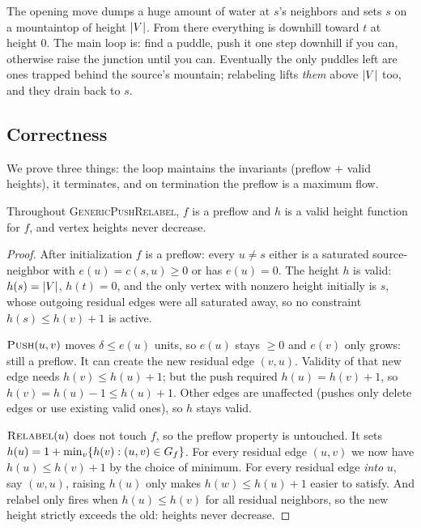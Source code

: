 \begin{intuitionbox}
The opening move dumps a huge amount of water at $s$'s neighbors and sets $s$ on a mountaintop of height $\lvert V\rvert$. From there everything is downhill toward $t$ at height $0$. The main loop is: find a puddle, push it one step downhill if you can, otherwise raise the junction until you can. Eventually the only puddles left are ones trapped behind the source's mountain; relabeling lifts \emph{them} above $\lvert V\rvert$ too, and they drain back to $s$.
\end{intuitionbox}

\subsection{Correctness}
\label{ch13:correctness}

We prove three things: the loop maintains the invariants (preflow $+$ valid heights), it terminates, and on termination the preflow is a maximum flow.

\begin{lemma}
\label{ch13:lem-invariants}
Throughout \textsc{GenericPushRelabel}, $f$ is a preflow and $h$ is a valid height function for $f$, and vertex heights never decrease.
\end{lemma}

\begin{proof}
After initialization $f$ is a preflow: every $u\ne s$ either is a saturated source-neighbor with $e(u)=c(s,u)\ge0$ or has $e(u)=0$. The height $h$ is valid: $h(s)=\lvert V\rvert$, $h(t)=0$, and the only vertex with nonzero height initially is $s$, whose outgoing residual edges were all saturated away, so no constraint $h(s)\le h(v)+1$ is active.

$\textsc{Push}(u,v)$ moves $\delta\le e(u)$ units, so $e(u)$ stays $\ge0$ and $e(v)$ only grows: still a preflow. It can create the new residual edge $(v,u)$. Validity of that new edge needs $h(v)\le h(u)+1$; but the push required $h(u)=h(v)+1$, so $h(v)=h(u)-1\le h(u)+1$. Other edges are unaffected (pushes only delete edges or use existing valid ones), so $h$ stays valid.

$\textsc{Relabel}(u)$ does not touch $f$, so the preflow property is untouched. It sets $h(u)=1+\min_v\{h(v):(u,v)\in G_f\}$. For every residual edge $(u,v)$ we now have $h(u)\le h(v)+1$ by the choice of minimum. For every residual edge \emph{into} $u$, say $(w,u)$, raising $h(u)$ only makes $h(w)\le h(u)+1$ easier to satisfy. And relabel only fires when $h(u)\le h(v)$ for all residual neighbors, so the new height strictly exceeds the old: heights never decrease.
\end{proof}

